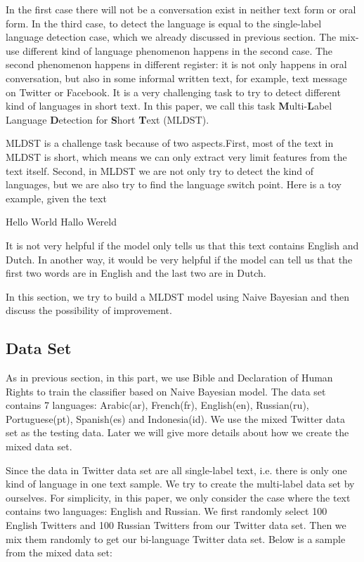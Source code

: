 \documentclass[11pt]{article}
\begin{document}
In the first case there will not be a conversation exist in neither text form or oral form. In the third case, to detect the language is equal to the single-label language detection case, which we already discussed in previous section. The mix-use different kind of language phenomenon happens in the second case. The second phenomenon happens in different register: it is not only happens in oral conversation, but also in some informal written text, for example, text message on Twitter or Facebook. It is a very challenging task to try to detect different kind of languages in short text. In this paper, we call this task \textbf{M}ulti-\textbf{L}abel Language \textbf{D}etection for \textbf{S}hort \textbf{T}ext (MLDST).

MLDST is a challenge task because of two aspects.First, most of the text in MLDST is short, which means we can only extract very limit features from the text itself. Second, in MLDST we are not only try to detect the kind of languages, but we are also try to find the language switch point. Here is a toy example, given the text
\begin{center}
Hello World Hallo Wereld
\end{center}
It is not very helpful if the model only tells us that this text contains English and Dutch. In another way, it would be very helpful if the model can tell us that the first two words are in English and the last two are in Dutch. 

In this section, we try to build a MLDST model using Naive Bayesian and then discuss the possibility of improvement.



\subsection{Data Set}
As in previous section, in this part, we use Bible and Declaration of Human Rights to train the classifier based on Naive Bayesian model. The data set contains 7 languages: Arabic(ar), French(fr), English(en), Russian(ru), Portuguese(pt), Spanish(es) and Indonesia(id).
We use the mixed Twitter data set as the testing data. Later we will give more details about how we create the mixed data set.

Since the data in Twitter data set are all single-label text, i.e. there is only one kind of language in one text sample. We try to create the multi-label data set by ourselves. For simplicity, in this paper, we only consider the case where the text contains two languages: English and Russian. We first randomly select 100 English Twitters and 100 Russian Twitters from our Twitter data set. Then we mix them randomly to get our bi-language Twitter data set. Below is a sample from the mixed data set:
\end{document}
